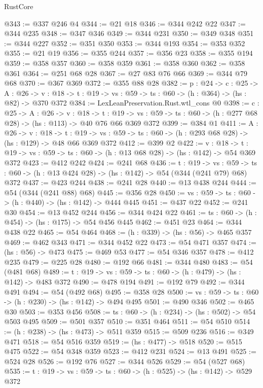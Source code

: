 \begin{lexlean}{RustCore}
\begin{coremodule}
@343 := @337 @246 @4
@344 := @21 @18
@346 := @344 @242 @22
@347 := @344 @235
@348 := @347 @346
@349 := @344 @231
@350 := @349 @348
@351 := @344 @227
@352 := @351 @350
@353 := @344 @193
@354 := @353 @352
@355 := @21 @19
@356 := @355 @244
@357 := @356 @23
@358 := @355 @194
@359 := @358 @357
@360 := @358 @359
@361 := @358 @360
@362 := @358 @361
@364 := @251 @68 @28
@367 := @27 @83 @76 @66
@369 := @344 @79 @68
@370 := @367 @369
@372 := @355 @88 @28
@382 := {p : @24} ->
  {c : @25} ->
  {A : @26} ->
  {v : @18} -> {t : @19} -> {vs : @59} -> {ts : @60} -> (h : @364) -> (hs : @82) -> @370 @372
@384 := LexLeanPreservation.Rust.wtl_cons @0
@398 := {c : @25} ->
  {A : @26} ->
  {v : @18} ->
  {t : @19} ->
  {vs : @59} -> {ts : @60} -> (h : @277 @68 @28) -> (hs : @113) -> @40 @76 @66 @369 @372
@399 := @384 @1
@411 := {A : @26} ->
  {v : @18} ->
  {t : @19} -> {vs : @59} -> {ts : @60} -> (h : @293 @68 @28) -> (hs : @129) -> @48 @66 @369 @372
@412 := @399 @2
@422 := {v : @18} ->
  {t : @19} -> {vs : @59} -> {ts : @60} -> (h : @13 @68 @28) -> (hs : @142) -> @54 @369 @372
@423 := @412 @242
@424 := @241 @68
@436 := {t : @19} ->
  {vs : @59} -> {ts : @60} -> (h : @13 @424 @28) -> (hs : @142) -> @54 (@344 (@241 @79) @68) @372
@437 := @423 @244
@438 := @241 @28
@440 := @13 @438 @244
@444 := @54 (@344 (@241 @88) @68)
@445 := @356 @28
@450 := {vs : @59} -> {ts : @60} -> (h : @440) -> (hs : @142) -> @444 @445
@451 := @437 @22
@452 := @241 @30
@454 := @13 @452 @244
@456 := @344 @424 @22
@461 := {ts : @60} -> (h : @454) -> (hs : @175) -> @54 @456 @445
@462 := @451 @23
@464 := @344 @438 @22
@465 := @54 @464
@468 := (h : @339) -> (hs : @56) -> @465 @357
@469 := @462 @343
@471 := @344 @452 @22
@473 := @54 @471 @357
@474 := (hs : @56) -> @473
@475 := @469 @53
@477 := @54 @346 @357
@478 := @412 @235
@479 := @225 @28
@480 := @192 @66
@481 := @344 @480
@483 := @54 (@481 @68)
@489 := {t : @19} -> {vs : @59} -> {ts : @60} -> (h : @479) -> (hs : @142) -> @483 @372
@490 := @478 @194
@491 := @192 @79
@492 := @344 @491
@494 := @54 (@492 @68)
@495 := @358 @28
@500 := {vs : @59} -> {ts : @60} -> (h : @230) -> (hs : @142) -> @494 @495
@501 := @490 @346
@502 := @465 @30
@503 := @353 @456
@508 := {ts : @60} -> (h : @234) -> (hs : @502) -> @54 @503 @495
@509 := @501 @357
@510 := @351 @464
@511 := @54 @510
@514 := (h : @238) -> (hs : @473) -> @511 @359
@515 := @509 @236
@516 := @349 @471
@518 := @54 @516 @359
@519 := (hs : @477) -> @518
@520 := @515 @475
@522 := @54 @348 @359
@523 := @412 @231
@524 := @13 @491
@525 := @524 @28
@526 := @192 @76
@527 := @344 @526
@529 := @54 (@527 @68)
@535 := {t : @19} -> {vs : @59} -> {ts : @60} -> (h : @525) -> (hs : @142) -> @529 @372

\end{coremodule}
\end{lexlean}
